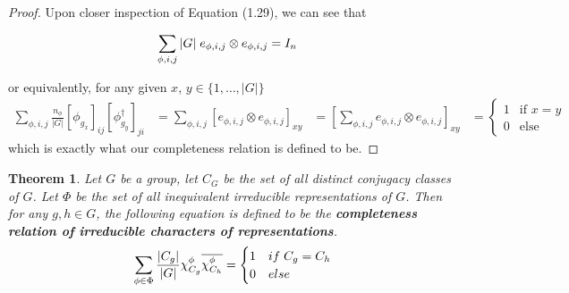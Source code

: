 \documentclass[10pt]{ucthesis}
\newtheorem{theorem}[definition]{Theorem}
\begin{document}
\begin{proof}
Upon closer inspection of Equation (1.29), we can see that 

\begin{equation}
	\begin{aligned}
		\sum_{\phi,i,j} {|G|} \hspace{1mm}e_{\phi,i,j} \otimes e_{\phi,i,j} &= I_n
	\end{aligned}
\end{equation}

or equivalently, for any given $x$, $y \in \{1,\hdots,|G|\}$ 
\begin{equation}
	\begin{aligned}
		\sum_{\phi,i,j} \frac{n_\phi}{|G|} [\phi_{g_x}]_{ij}[\phi^\dag_{g_y}]_{ji} &= \sum_{\phi,i,j} \left[e_{\phi,i,j} \otimes e_{\phi,i,j}\right]_{xy} &= \left[\sum_{\phi,i,j} e_{\phi,i,j} \otimes e_{\phi,i,j}\right]_{xy} &= \begin{cases}
																	1 & \text{if } x=y\\
																	0 & \text{else}
																\end{cases}
	\end{aligned}
\end{equation}
which is exactly what our completeness relation is defined to be. \end{proof} 







\begin{theorem}
Let $G$ be a group, let $C_G$ be the set of all distinct conjugacy classes of $G$. Let $\Phi$ be the set of all inequivalent irreducible representations of $G$. Then for any $g,h \in G$, the following equation is defined to be the \textbf{completeness relation of irreducible characters of representations}.
$$\sum_{\phi \in \Phi} \frac{|C_g|}{|G|} \chi^{\phi}_{C_g} \overline{\chi^{\phi}_{C_h}} = \begin{cases}
																1 & if \hspace{1mm} C_g = C_h \\
																0 & else
															\end{cases}$$
\end{theorem}
\end{document}
